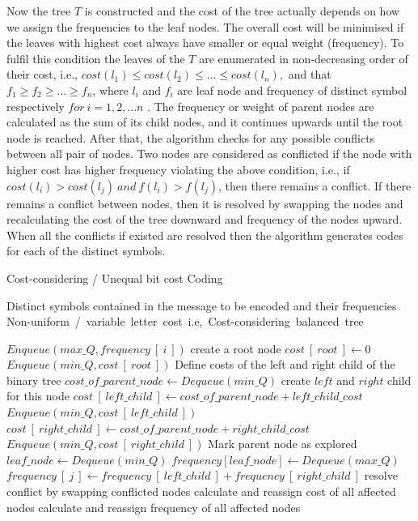 \documentclass[preprint,12pt]{elsarticle}
\begin{document}
Now the tree $T$ is constructed and the cost of the tree actually depends on how we assign the frequencies to the leaf nodes. The overall cost will be minimised if the leaves with highest cost always have smaller or equal weight (frequency). To fulfil this condition the leaves of the $T$ are enumerated in non-decreasing order of their cost, i.e., $cost(l_1)\leq cost(l_2)\leq \ldots \leq cost(l_n),$ and that $f_1 \geq f_2 \geq \ldots\geq f_n$, where $l_i$ and $f_i$ are leaf node and frequency of distinct symbol respectively $for~ i=1,2,\ldots n$ . The frequency or weight of parent nodes are calculated as the sum of its child nodes, and it continues upwards until the root node is reached. After that, the algorithm checks for any possible conflicts between all pair of nodes. Two nodes are considered as conflicted if the node with higher cost has higher frequency violating the above condition, i.e., if $cost(l_i)> cost(l_j)~and~f(l_i)>f(l_j)$, then there remains a conflict.  If there remains a conflict between nodes, then it is resolved by swapping the nodes and recalculating the cost of the tree downward and frequency of the nodes upward.  When all the conflicts if existed are resolved then the algorithm generates codes for each of the distinct symbols.   
\begin{algorithm}[!btph]
\caption{Cost-considering / Unequal bit cost Coding}
\label{alg1}

\begin{algorithmic}[1]
\REQUIRE Distinct symbols contained in the message to be encoded and their frequencies 
\ENSURE Non-uniform\ /\ variable\ letter\ cost\ i.e,\ Cost-considering\ balanced\ tree

\STATE $ Enqueue\left(max\_Q , frequency~[~i~]\right)$
\ENDFOR
\STATE create a root node
\STATE $cost~[~root~]\leftarrow 0$
\STATE $Enqueue\left(min\_Q , cost~[~root~]\right)$
\STATE Define costs of the left and right child of the binary tree
\REPEAT 
\STATE $cost\_of\_parent\_node\leftarrow Dequeue\left(min\_Q\right)$
\STATE create $left$ and $right$ child for this node
\STATE $cost~[~left\_child~]\leftarrow cost\_of\_parent\_node+left\_child\_cost$
\STATE $Enqueue\left(min\_Q , cost~[~left\_child~]\right)$
\STATE $cost~[~right\_child~]\leftarrow cost\_of\_parent\_node+right\_child\_cost$
\STATE $Enqueue\left(min\_Q , cost~[~right\_child~]\right)$
\STATE Mark parent node as explored
\STATE $leaf\_node\leftarrow Dequeue\left(min\_Q\right)$
\STATE $frequency[leaf\_node]\leftarrow Dequeue\left(max\_Q\right)$
\ENDWHILE
{} 
\STATE $frequency~[~j~]\leftarrow frequency~[~left\_child~]+frequency~[~right\_child~]$
\ENDFOR
\REPEAT
{} 
\STATE resolve conflict by swapping conflicted nodes
\STATE calculate and reassign cost of all affected nodes
\STATE calculate and reassign frequency of all affected nodes 
\ENDIF
{}
\end{algorithmic}
\end{algorithm}
\end{document}
